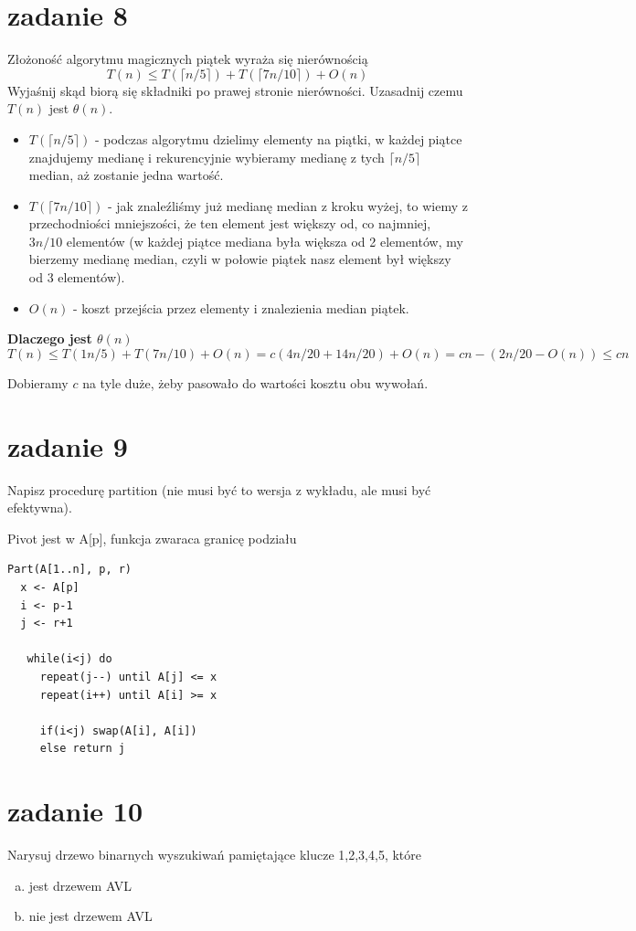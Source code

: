 \documentclass[svgnames]{report}
\begin{document}
\section{zadanie 8}
\begin{framed}
Złożoność algorytmu magicznych piątek wyraża się nierównością
$$ T(n) \leq T(\lceil n/5\rceil) + T(\lceil 7n/10\rceil) + O(n) $$
Wyjaśnij skąd biorą się składniki po prawej stronie nierówności. Uzasadnij czemu $T(n)$ jest $\theta(n)$.
\end{framed}
\begin{itemize}
\item $T(\lceil n/5\rceil)$ - podczas algorytmu dzielimy elementy na piątki, w każdej piątce znajdujemy medianę i rekurencyjnie wybieramy medianę z tych $\lceil n/5 \rceil$ median, aż zostanie jedna wartość.
\item $T(\lceil 7n/10\rceil)$ - jak znaleźliśmy już medianę median z kroku wyżej, to wiemy z przechodniości mniejszości, że ten element jest większy od, co najmniej, $3n/10$ elementów (w każdej piątce mediana była większa od 2 elementów, my bierzemy medianę median, czyli w połowie piątek nasz element był większy od 3 elementów).
\item $O(n)$ - koszt przejścia przez elementy i znalezienia median piątek.
\end{itemize}
\textbf{Dlaczego jest $\theta(n)$}
$$T(n) \leq T(1n/5)+T(7n/10)+O(n)= c(4n/20 + 14n/20)+O(n)= cn - (2n/20 - O(n)) \leq cn$$

Dobieramy $c$ na tyle duże, żeby pasowało do wartości kosztu obu wywołań.

\section{zadanie 9}
\begin{framed}
Napisz procedurę partition (nie musi być to wersja z wykładu, ale musi być efektywna).
\end{framed}
Pivot jest w A[p], funkcja zwaraca granicę podziału
\begin{lstlisting}
Part(A[1..n], p, r)
  x <- A[p] 
  i <- p-1 
  j <- r+1
  
   while(i<j) do
     repeat(j--) until A[j] <= x
     repeat(i++) until A[i] >= x
    
     if(i<j) swap(A[i], A[i])
     else return j 
\end{lstlisting}

\section{zadanie 10}
\begin{framed}
Narysuj drzewo binarnych wyszukiwań pamiętające klucze 1,2,3,4,5, które
\begin{enumerate}[a)]
	\item jest drzewem AVL
	\item nie jest drzewem AVL
\end{enumerate}
\end{framed}
\end{document}
